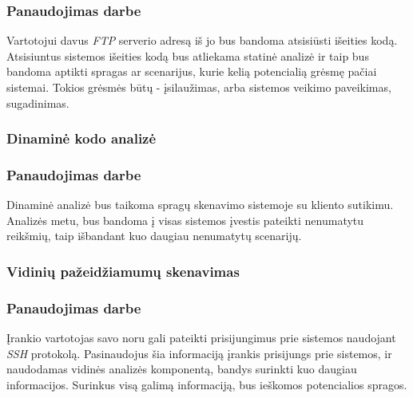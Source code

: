 \documentclass[a4paper,12pt,fleqn]{article}
\begin{document}
\subsubsection{Panaudojimas darbe}
\label{sec:data}
Vartotojui davus \textit{FTP} serverio adresą iš jo bus bandoma atsisiūsti išeities kodą. Atsisiuntus sistemos išeities kodą bus atliekama statinė analizė ir taip bus bandoma aptikti spragas ar scenarijus, kurie kelią potencialią grėsmę pačiai sistemai. Tokios grėsmės būtų - įsilaužimas, arba sistemos veikimo paveikimas, sugadinimas. 

\subsubsection{Dinaminė kodo analizė}

\subsubsection{Panaudojimas darbe}
\label{sec:data}
Dinaminė analizė bus taikoma spragų skenavimo sistemoje su kliento sutikimu. Analizės metu, bus bandoma į visas sistemos įvestis pateikti nenumatytu reikšmių, taip išbandant kuo daugiau nenumatytų scenarijų.


\subsubsection{Vidinių pažeidžiamumų skenavimas}

\subsubsection{Panaudojimas darbe}
\label{sec:data}
Įrankio vartotojas savo noru gali pateikti prisijungimus prie sistemos naudojant \textit{SSH} protokolą. Pasinaudojus šia informaciją įrankis prisijungs prie sistemos, ir naudodamas vidinės analizės komponentą, bandys surinkti kuo daugiau informacijos. Surinkus visą galimą informaciją, bus ieškomos potencialios spragos.

%



\end{document}
